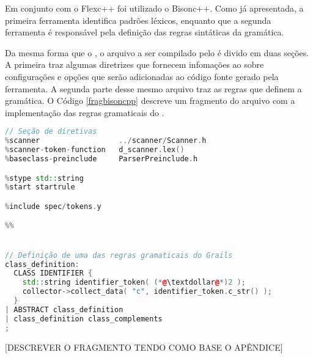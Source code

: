 Em conjunto com o \textsf{Flexc++} foi utilizado o \textsf{Bisonc++}. Como já
apresentada, a primeira ferramenta identifica padrões léxicos, enquanto que a
segunda ferramenta é responsável pela definição das regras sintáticas da
gramática.

Da mesma forma que o \flexcpp, o arquivo a ser compilado pelo \bisoncpp é divido
em duas seções. A primeira traz algumas diretrizes que fornecem infomações ao
\bisoncpp sobre configurações e opções que serão adicionadas ao código fonte
gerado pela ferramenta. A segunda parte desse mesmo arquivo traz as regras
que definem a gramática. O Código \ref{fragbisoncpp} descreve um fragmento
do arquivo com a implementação das regras gramaticais do \grails.

\begin{lstlisting}[language=C++, label=fragbisoncpp, caption=Fragmento do código fonte para o \bisoncpp]
// Seção de diretivas
%scanner                  ../scanner/Scanner.h
%scanner-token-function   d_scanner.lex()
%baseclass-preinclude     ParserPreinclude.h

%stype std::string
%start startrule

%include spec/tokens.y

%%


// Definição de uma das regras gramaticais do Grails
class_definition:
  CLASS IDENTIFIER {
    std::string identifier_token( (*@\textdollar@*)2 );
    collector->collect_data( "c", identifier_token.c_str() );
  }
| ABSTRACT class_definition
| class_definition class_complements
;
\end{lstlisting}

[DESCREVER O FRAGMENTO TENDO COMO BASE O APÊNDICE]




